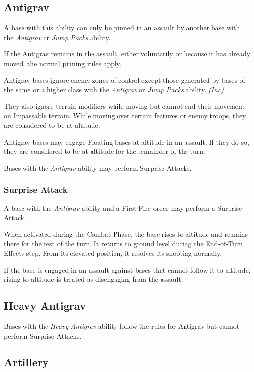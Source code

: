 \subsection{Antigrav}

A base with this ability can only be pinned in an assault by another base with the \textit{Antigrav} or \textit{Jump Packs} ability.

If the Antigrav remains in the assault, either voluntarily or because it has already moved, the normal pinning rules apply.

Antigrav bases ignore enemy zones of control except those generated by bases of the same or a higher class with the \textit{Antigrav} or \textit{Jump Packs} ability. \textit{(Inc)}

They also ignore terrain modifiers while moving but cannot end their movement on Impassable terrain. While moving over terrain features or enemy troops, they are considered to be at altitude.

Antigrav bases may engage Floating bases at altitude in an assault. If they do so, they are considered to be at altitude for the remainder of the turn.

Bases with the \textit{Antigrav} ability may perform Surprise Attacks.

\subsubsection{Surprise Attack}

A base with the \textit{Antigrav} ability and a First Fire order may perform a Surprise Attack.

When activated during the Combat Phase, the base rises to altitude and remains there for the rest of the turn. It returns to ground level during the End-of-Turn Effects step. From its elevated position, it resolves its shooting normally.

If the base is engaged in an assault against bases that cannot follow it to altitude, rising to altitude is treated as disengaging from the assault.

\subsection{Heavy Antigrav}

Bases with the \textit{Heavy Antigrav} ability follow the rules for Antigrav but cannot perform Surprise Attacks.

\subsection{Artillery}

